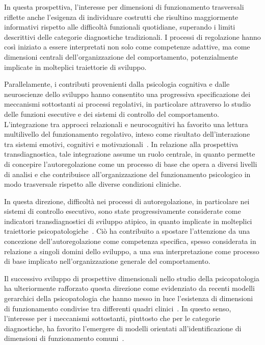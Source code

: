             In questa prospettiva, l'interesse per dimensioni di funzionamento trasversali riflette anche l'esigenza di individuare costrutti che risultino maggiormente informativi rispetto alle difficoltà funzionali quotidiane, superando i limiti descrittivi delle categorie diagnostiche tradizionali. I processi di regolazione hanno così iniziato a essere interpretati non solo come competenze adattive, ma come dimensioni centrali dell'organizzazione del comportamento, potenzialmente implicate in molteplici traiettorie di sviluppo.

            Parallelamente, i contributi provenienti dalla psicologia cognitiva e dalle neuroscienze dello sviluppo hanno consentito una progressiva specificazione dei meccanismi sottostanti ai processi regolativi, in particolare attraverso lo studio delle funzioni esecutive e dei sistemi di controllo del comportamento. L'integrazione tra approcci relazionali e neurocognitivi ha favorito una lettura multilivello del funzionamento regolativo, inteso come risultato dell'interazione tra sistemi emotivi, cognitivi e motivazionali~\cite{blair2015,diamond2013}. In relazione alla prospettiva transdiagnostica, tale integrazione assume un ruolo centrale, in quanto permette di concepire l'autoregolazione come un processo di base che opera a diversi livelli di analisi e che contribuisce all'organizzazione del funzionamento psicologico in modo trasversale rispetto alle diverse condizioni cliniche.

            In questa direzione, difficoltà nei processi di autoregolazione, in particolare nei sistemi di controllo esecutivo, sono state progressivamente considerate come indicatori transdiagnostici di sviluppo atipico, in quanto implicate in molteplici traiettorie psicopatologiche~\cite{beauchaine2015}. Ciò ha contribuito a spostare l'attenzione da una concezione dell'autoregolazione come competenza specifica, spesso considerata in relazione a singoli domini dello sviluppo, a una sua interpretazione come processo di base implicato nell'organizzazione generale del comportamento.

            Il successivo sviluppo di prospettive dimensionali nello studio della psicopatologia ha ulteriormente rafforzato questa direzione come evidenziato da recenti modelli gerarchici della psicopatologia che hanno messo in luce l'esistenza di dimensioni di funzionamento condivise tra differenti quadri clinici~\cite{caspi2014,kotov2017}. In questo senso, l'interesse per i meccanismi sottostanti, piuttosto che per le categorie diagnostiche, ha favorito l'emergere di modelli orientati all'identificazione di dimensioni di funzionamento comuni~\cite{astle2022}.

